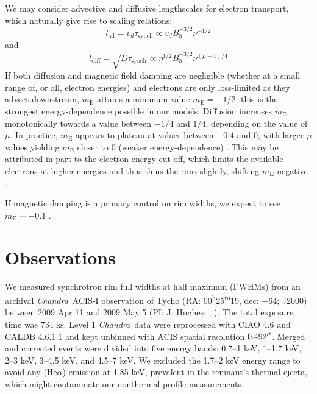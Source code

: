 \documentclass[iop, apj, numberedappendix]{emulateapj}
\newcommand*{\mt}{\mathrm}
\newcommand*{\unit}[1]{\;\mt{#1}}  %
\newcommand*{\tsup}{\textsuperscript}
\newcommand*{\Chandra}{\textit{Chandra}\ }
\newcommand*{\tsynch}{\tau_{\mt{synch}}}
\newcommand*{\mE}{m_\mt{E}}
\begin{document}
We may consider advective and diffusive lengthscales for electron transport,
which naturally give rise to scaling relations:
\begin{equation} \label{eq:lad}
    l_{\mt{ad}} = v_d \tsynch \propto v_d B_0^{-3/2} \nu^{-1/2}
\end{equation}
and
\begin{equation} \label{eq:ldiff}
    l_{\mt{diff}} = \sqrt{D \tsynch} \propto \eta^{1/2} B_0^{-3/2} \nu^{(\mu-1)/4}
\end{equation}
If both diffusion and magnetic field damping are negligible (whether at a small
range of, or all, electron energies) and electrons are only loss-limited as
they advect downstream, $\mE$ attains a minimum value $\mE = -1/2$; this is the
strongest energy-dependence possible in our models.  Diffusion increases $\mE$
monotonically towards a value between $-1/4$ and $1/4$, depending on the value
of $\mu$.  In practice, $\mE$ appears to plateau at values between $-0.4$ and
$0$, with larger $\mu$ values yielding $\mE$ closer to $0$ (weaker
energy-dependence) .  This may be attributed
in part to the electron energy cut-off, which limits the available electrons at
higher energies and thus thins the rims slightly, shifting $\mE$ negative
.

If magnetic damping is a primary control on rim widths, we expect to see $\mE
\sim -0.1$ .

\section{Observations}
\label{sec:observations}

We measured synchrotron rim full widths at half maximum (FWHMs) from an
archival \Chandra ACIS-I observation of Tycho
(RA: 00\tsup{h}25\tsup{m}19, dec: +64; J2000)
between 2009 Apr 11 and 2009 May 5 (PI: J. Hughes;
,
).
The total exposure time was $734 \unit{ks}$.
Level 1 \Chandra data were reprocessed with CIAO 4.6 and CALDB 4.6.1.1 and kept
unbinned with ACIS spatial resolution $0.492\mbox{$^{\prime\prime}$}$.
Merged and corrected events were divided into five energy bands:
0.7--1 keV, 1--1.7 keV, 2--3 keV, 3--4.5 keV, and 4.5--7 keV.
We excluded the 1.7--2 keV energy range to avoid any  (He$\alpha$)
emission at 1.85 keV, prevalent in the remnant's thermal ejecta, which
might contaminate our nonthermal profile measurements.
\end{document}
